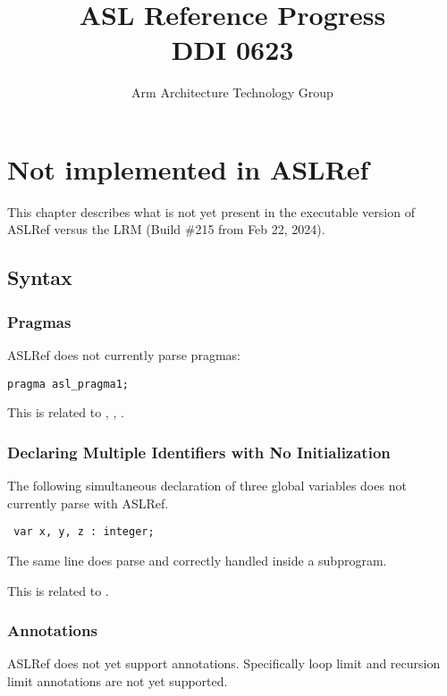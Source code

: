 \documentclass{book}
\author{Arm Architecture Technology Group}
\title{ASL Reference Progress \\
       DDI 0623}
\begin{document}
\maketitle

\tableofcontents{}





\chapter{Not implemented in ASLRef}

This chapter describes what is not yet present in the executable version of ASLRef
versus the LRM (Build \#215 from Feb 22, 2024).

\section{Syntax}

\subsection{Pragmas}
ASLRef does not currently parse pragmas:
\begin{verbatim}
pragma asl_pragma1;
\end{verbatim}

This is related to , , .

\subsection{Declaring Multiple Identifiers with No Initialization}
The following simultaneous declaration of three global variables does not currently parse with ASLRef.
\begin{verbatim}
 var x, y, z : integer;
\end{verbatim}

The same line does parse and correctly handled inside a subprogram.

This is related to .

\subsection{Annotations}
ASLRef does not yet support annotations.
Specifically loop limit and recursion limit annotations are not yet supported.
\end{document}
